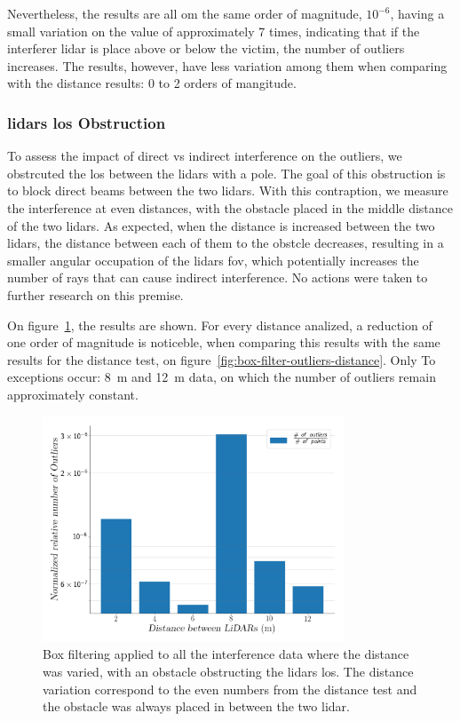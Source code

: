Nevertheless, the results are all om the same order of magnitude, $10^{-6}$, having a small variation on the value of approximately 7 times, indicating that if the interferer \ac{lidar} is place above or below the victim, the number of outliers increases. The results, however, have less variation among them when comparing with the distance results: 0 to 2 orders of mangitude.


\subsubsection{\acp{lidar} \ac{los} Obstruction}
To assess the impact of direct vs indirect interference on the outliers, we obstrcuted the \acf{los} between the \acp{lidar} with a pole. The goal of this obstruction is to block direct beams between the two \acp{lidar}. With this contraption, we measure the interference at even distances, with the obstacle placed in the middle distance of the two \acp{lidar}. As expected, when the distance is increased between the two \acp{lidar}, the distance between each of them to the obstcle decreases, resulting in a smaller angular occupation of the \acp{lidar} \ac{fov}, which potentially increases the number of rays that can cause indirect interference. No actions were taken to further research on this premise.

On figure~\ref{fig:box-filter-outliers-LOS}, the results are shown. For every distance analized, a reduction of one order of magnitude is noticeble, when comparing this results with the same results for the distance test, on figure~\ref{fig:box-filter-outliers-distance}. Only To exceptions occur: \SI{8}{\meter} and \SI{12}{\meter} data, on which the number of outliers remain approximately constant. 

\begin{figure}[!ht]
	\centering
	\includegraphics[width=0.8\textwidth]{img/lidar-interference/box-filtering/interference-box-filter-outliers-LOS.png}
	\caption{Box filtering applied to all the interference data where the distance was varied, with an obstacle obstructing the \acp{lidar} \ac{los}. The distance variation correspond to the even numbers from the distance test and the obstacle was always placed in between the two \ac{lidar}.}
	\label{fig:box-filter-outliers-LOS}
\end{figure}

